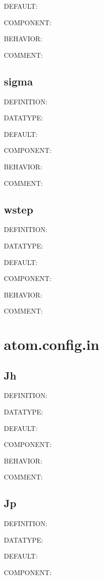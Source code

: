 {\color{blue}DEFAULT:}

{\color{brown}COMPONENT:}

{\color{purple}BEHAVIOR:}

{\color{olive}COMMENT:}

\subsection{sigma}
{\color{red}DEFINITION:}

{\color{green}DATATYPE:}

{\color{blue}DEFAULT:}

{\color{brown}COMPONENT:}

{\color{purple}BEHAVIOR:}

{\color{olive}COMMENT:}

\subsection{wstep}
{\color{red}DEFINITION:}

{\color{green}DATATYPE:}

{\color{blue}DEFAULT:}

{\color{brown}COMPONENT:}

{\color{purple}BEHAVIOR:}

{\color{olive}COMMENT:}

\section{atom.config.in}
\subsection{Jh}
{\color{red}DEFINITION:}

{\color{green}DATATYPE:}

{\color{blue}DEFAULT:}

{\color{brown}COMPONENT:}

{\color{purple}BEHAVIOR:}

{\color{olive}COMMENT:}

\subsection{Jp}
{\color{red}DEFINITION:}

{\color{green}DATATYPE:}

{\color{blue}DEFAULT:}

{\color{brown}COMPONENT:}

